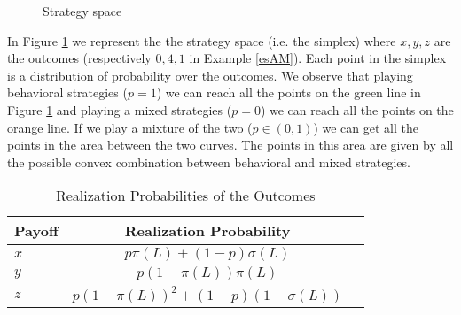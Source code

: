 \begin{figure}[h] 
	\centering
{} 
\caption{Strategy space} \label{simplex}
\end{figure}

\noindent
In Figure \ref{simplex} we represent the the strategy space (i.e. the simplex) where $x, y, z$ are the outcomes (respectively $0, 4, 1$ in Example \ref{esAM}). Each point in the simplex is a distribution of probability over the outcomes.  We observe that playing behavioral strategies ($p=1$) we can reach all the points on the green line in Figure \ref{simplex} and playing a mixed strategies ($p=0$) we can reach all the points on the orange line. If we play a mixture of the two ($p \in (0,1)$) we can get all the points in the area between the two curves. The points in this area are given by all the possible convex combination between behavioral and mixed strategies. \\


\begin{table}[h]
	\begin{center} 
		\begin{tabular}{|l|c|r|}
			
			\hline
			Payoff & Realization Probability \\
			\hline
			\hline
			$x$ & $p\pi(L) + (1-p)\sigma(L)$ \\
			\hline
			$y$ & $p(1-\pi(L))\pi(L)$ \\
			\hline
			$z$ & $p(1-\pi(L))^2 + (1-p)(1-\sigma(L))$ \\
			\hline
		\end{tabular}
	\end{center}
	\caption{Realization Probabilities of the Outcomes}
	\label{tab_AM}
\end{table}  


